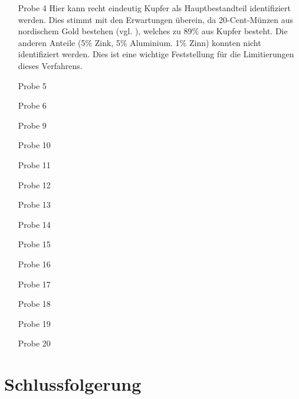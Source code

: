 \documentclass[
	a4paper,
	12pt,
	pagesize,
	ngerman
]{scrartcl}
\begin{document}
	\begin{enumerate} %
		\item[Probe 4] Hier kann recht eindeutig Kupfer als Hauptbestandteil identifiziert werden. Dies stimmt mit den Erwartungen überein, da 20-Cent-Münzen aus nordischem Gold bestehen (vgl. \cite{muenzen}), welches zu 89\% aus Kupfer besteht. Die anderen Anteile (5\% Zink, 5\% Aluminium. 1\% Zinn) konnten nicht identifiziert werden. Dies ist eine wichtige Feststellung für die Limitierungen dieses Verfahrens. %
		\item[Probe 5] 
		\item[Probe 6]
		\item[Probe 9]
		\item[Probe 10]
		\item[Probe 11]
		\item[Probe 12]
		\item[Probe 13]
		\item[Probe 14]
		\item[Probe 15]
		\item[Probe 16]
		\item[Probe 17]
		\item[Probe 18]
		\item[Probe 19]
		\item[Probe 20]
	\end{enumerate}
	
	\section{Schlussfolgerung}
	
	
	\printbibliography
\end{document}
